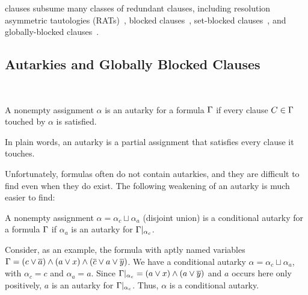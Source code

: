 


\pr clauses subsume many classes of redundant clauses, including resolution
asymmetric tautologies (RATs)~\cite{rat}, blocked clauses~\cite{blockedclause},
set-blocked clauses~\cite{setblocked}, and globally-blocked
clauses~\cite{conditionalautarkies}.

\subsection{Autarkies and Globally Blocked Clauses}~\label{subsec:autarkies}


\begin{definition}
    A nonempty assignment $\alpha$ is an autarky for a formula $\Gamma$ if
    every clause $C \in \Gamma$ touched by $\alpha$ is satisfied.
\end{definition}


In plain words, an autarky is a partial assignment that satisfies every clause it
touches.

Unfortunately, formulas often do not contain autarkies, and they are difficult
to find even when they do exist. The following weakening of an autarky is much
easier to find: 

\begin{definition}
    A nonempty assignment $\alpha = \alpha_c \sqcup \alpha_a$ (disjoint union)
    is a conditional autarky for a formula $\Gamma$ if $\alpha_a$ is an
    autarky for $\Gamma|_{\alpha_c}$.
\end{definition}

Consider, as an example, the formula with aptly named variables $\Gamma = (c
\lor \overline{a}) \land (a \lor x) \land (\overline{c} \lor a \lor
\overline{y})$. We have a conditional autarky $\alpha = \alpha_c \sqcup
\alpha_a$, with $\alpha_c = c$ and $\alpha_a = a$. Since $\Gamma|_{\alpha_c} =
(a \lor x) \land (a \lor \overline{y})$ and $a$ occurs here only positively, $a$
is an autarky for $\Gamma|_{\alpha_c}$. Thus, $\alpha$ is a conditional autarky.


